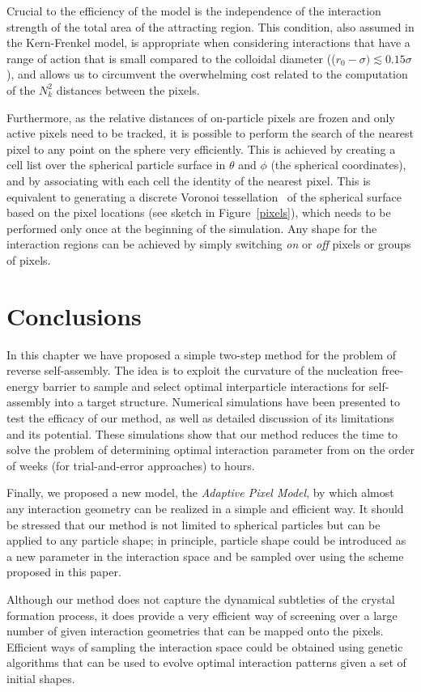 {Crucial to the efficiency of the model is the independence of the interaction strength of the total area of the attracting region.
This condition, also assumed in the Kern-Frenkel model, is appropriate when considering interactions that have a range of action that is small compared to the colloidal diameter (($r_0-\sigma)\lesssim 0.15\sigma$), and allows us to circumvent the overwhelming cost related to the computation of the $N_k^2$ distances between the pixels.

Furthermore, as the relative distances of on-particle pixels are frozen and only active pixels need to be tracked, it is possible to perform the
search of the nearest pixel to any point on the sphere very efficiently.
This is achieved by creating a cell list over the spherical particle surface in $\theta$ and $\phi$ (the spherical coordinates), and by associating with each cell the identity of the nearest pixel.
This is equivalent to generating a discrete Voronoi tessellation~\cite{geom} of the spherical surface based on the pixel locations (see sketch in Figure~\ref{pixels}), which needs to be performed only once at the beginning of the simulation.
Any shape for the interaction regions can be achieved by simply switching {\it on} or {\it off} pixels or groups of pixels. }

\section{Conclusions}

In this chapter we have proposed a simple two-step method for the problem of reverse self-assembly.
The idea is to exploit the curvature of the nucleation free-energy barrier to sample and select optimal interparticle interactions for self-assembly into a target structure.
Numerical simulations have been presented to test the efficacy of our method, as well as detailed discussion of its limitations and its potential. 
These simulations show that our method reduces the time to solve the problem of determining optimal interaction parameter from on the order of weeks (for trial-and-error approaches) to hours.

Finally, we proposed a new model, the {\it {Adaptive Pixel Model}}, by which almost any interaction geometry can be realized in a simple and efficient way.
It should be stressed that our method is not limited to spherical particles but can be applied to any particle shape;
in principle, particle shape could be introduced as a new parameter in the interaction space and be sampled over using the scheme proposed in this paper.

Although our method does not capture the dynamical subtleties of the crystal formation process, it does provide a very efficient way of screening over a large number of given interaction geometries that can be mapped onto the pixels.
Efficient ways of sampling the interaction space could be obtained using genetic algorithms that can be used to evolve optimal interaction patterns given a set of initial shapes. 
